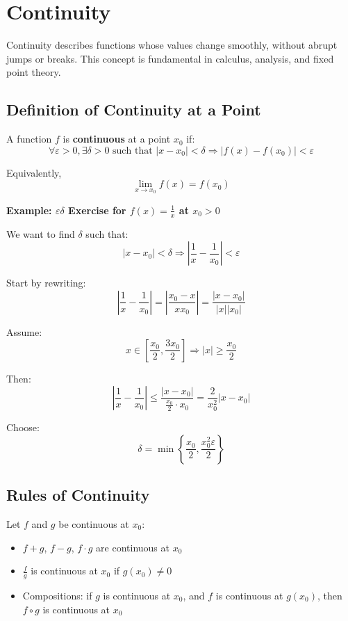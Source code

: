 \section{Continuity}

Continuity describes functions whose values change smoothly, without abrupt jumps or breaks. This concept is fundamental in calculus, analysis, and fixed point theory.

\subsection{Definition of Continuity at a Point}

A function \(f\) is \textbf{continuous} at a point \(x_0\) if:
\[
\forall \varepsilon > 0, \exists \delta > 0 \text{ such that } |x - x_0| < \delta \Rightarrow |f(x) - f(x_0)| < \varepsilon
\]

Equivalently,
\[
\lim_{x \to x_0} f(x) = f(x_0)
\]

\textbf{Example: \(\varepsilon \delta\) Exercise for \(f(x) = \frac{1}{x}\) at \(x_0 > 0\)}

We want to find \(\delta\) such that:
\[
|x - x_0| < \delta \Rightarrow \left|\frac{1}{x} - \frac{1}{x_0}\right| < \varepsilon
\]

Start by rewriting:
\[
\left|\frac{1}{x} - \frac{1}{x_0}\right| = \left|\frac{x_0 - x}{xx_0}\right| = \frac{|x - x_0|}{|x||x_0|}
\]

Assume:
\[
x \in \left[\frac{x_0}{2}, \frac{3x_0}{2}\right] \Rightarrow |x| \ge \frac{x_0}{2}
\]

Then:
\[
\left|\frac{1}{x} - \frac{1}{x_0}\right| \le \frac{|x - x_0|}{\frac{x_0}{2} \cdot x_0} = \frac{2}{x_0^2} |x - x_0|
\]

Choose:
\[
\delta = \min\left\{\frac{x_0}{2}, \frac{x_0^2 \varepsilon}{2} \right\}
\]

\subsection{Rules of Continuity}

Let \(f\) and \(g\) be continuous at \(x_0\):

\begin{itemize}[label=\(-\)]
\item \(f + g\), \(f - g\), \(f \cdot g\) are continuous at \(x_0\)
\item \(\frac{f}{g}\) is continuous at \(x_0\) if \(g(x_0) \ne 0\)
\item Compositions: if \(g\) is continuous at \(x_0\), and \(f\) is continuous at \(g(x_0)\), then \(f \circ g\) is continuous at \(x_0\)
\end{itemize}

